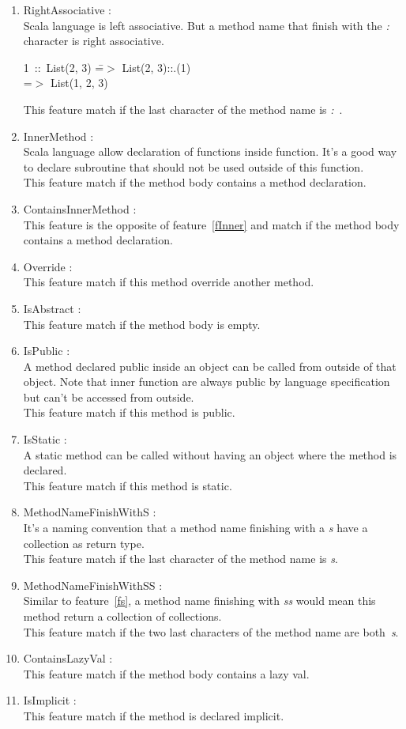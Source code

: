 \documentclass[12pt]{article}
\newcommand{\code}[1]{{\fontfamily{phv}\selectfont \small{\begin{tabbing} #1 \end{tabbing}}}}
\begin{document}
\begin{enumerate}
\item RightAssociative :\\
	Scala language is left associative. But a method name that finish with the \textit{:} character is right associative.
\code{
1\ ::\ List(2, 3) \==$>$ List(2, 3)::.(1)\\
\>=$>$ List(1, 2, 3)
}
This feature match if the last character of the method name is \textit{:}\ .
\item InnerMethod :\label{fInner}\\
	Scala language allow declaration of functions inside function. It's a good way to declare subroutine that should not be used outside of this function.\\
This feature match if the method body contains a method declaration.
\item ContainsInnerMethod :\\
	This feature is the opposite of feature~\ref{fInner} and match if the method body contains a method declaration.
\item Override : \\
	This feature match if this method override another method.
\item IsAbstract :\\
	This feature match if the method body is empty.
\item IsPublic  :\label{fPublic}\\
	A method declared public inside an object can be called from outside of that object. Note that inner function are always public by language specification but can't be accessed from outside.\\
This feature match if this method is public.
\item IsStatic :\\
	A static method can be called without having an object where the method is declared.\\
This feature match if this method is static. 
\item MethodNameFinishWithS :\label{fs}\\
	It's a naming convention that a method name finishing with a \textit{s} have a collection as return type.\\
This feature match if the last character of the method name is \textit{s}.
\item MethodNameFinishWithSS : \label{fss} \\
	Similar to feature~\ref{fs}, a method name finishing with \textit{ss} would mean this method return a collection of collections.\\ 
	This feature match if the two last characters of the method name are both~\textit{s}.
\item ContainsLazyVal :\\
	This feature match if the method body contains a lazy val.
\item IsImplicit : \\
	This feature match if the method is declared implicit.

\end{enumerate}
\end{document}
